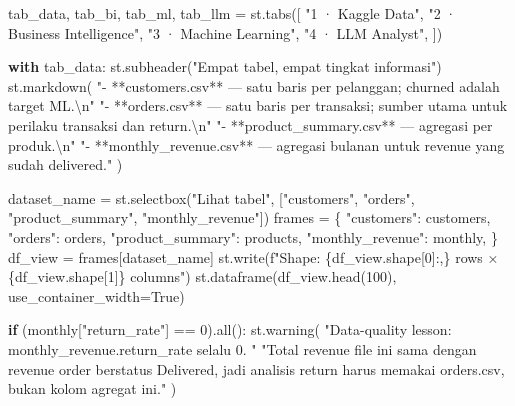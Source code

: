 \documentclass[
  indonesian,
  letterpaper,
  DIV=11,
  numbers=noendperiod]{scrreprt}
\newenvironment{Shaded}{\begin{snugshade}}{\end{snugshade}}
\newcommand{\BuiltInTok}[1]{\textcolor[rgb]{0.00,0.23,0.31}{#1}}
\newcommand{\CharTok}[1]{\textcolor[rgb]{0.13,0.47,0.30}{#1}}
\newcommand{\ControlFlowTok}[1]{\textcolor[rgb]{0.00,0.23,0.31}{\textbf{#1}}}
\newcommand{\DecValTok}[1]{\textcolor[rgb]{0.68,0.00,0.00}{#1}}
\newcommand{\NormalTok}[1]{\textcolor[rgb]{0.00,0.23,0.31}{#1}}
\newcommand{\OperatorTok}[1]{\textcolor[rgb]{0.37,0.37,0.37}{#1}}
\newcommand{\SpecialCharTok}[1]{\textcolor[rgb]{0.37,0.37,0.37}{#1}}
\newcommand{\SpecialStringTok}[1]{\textcolor[rgb]{0.13,0.47,0.30}{#1}}
\newcommand{\StringTok}[1]{\textcolor[rgb]{0.13,0.47,0.30}{#1}}
\newcommand{\VariableTok}[1]{\textcolor[rgb]{0.07,0.07,0.07}{#1}}
\begin{document}
\begin{Shaded}
\begin{Highlighting}[]
\NormalTok{tab\_data, tab\_bi, tab\_ml, tab\_llm }\OperatorTok{=}\NormalTok{ st.tabs([}
    \StringTok{"1 · Kaggle Data"}\NormalTok{,}
    \StringTok{"2 · Business Intelligence"}\NormalTok{,}
    \StringTok{"3 · Machine Learning"}\NormalTok{,}
    \StringTok{"4 · LLM Analyst"}\NormalTok{,}
\NormalTok{])}

\ControlFlowTok{with}\NormalTok{ tab\_data:}
\NormalTok{    st.subheader(}\StringTok{"Empat tabel, empat tingkat informasi"}\NormalTok{)}
\NormalTok{    st.markdown(}
        \StringTok{"{-} **customers.csv** — satu baris per pelanggan; \textasciigrave{}churned\textasciigrave{} adalah target ML.}\CharTok{\textbackslash{}n}\StringTok{"}
        \StringTok{"{-} **orders.csv** — satu baris per transaksi; sumber utama untuk perilaku transaksi dan return.}\CharTok{\textbackslash{}n}\StringTok{"}
        \StringTok{"{-} **product\_summary.csv** — agregasi per produk.}\CharTok{\textbackslash{}n}\StringTok{"}
        \StringTok{"{-} **monthly\_revenue.csv** — agregasi bulanan untuk revenue yang sudah delivered."}
\NormalTok{    )}

\NormalTok{    dataset\_name }\OperatorTok{=}\NormalTok{ st.selectbox(}\StringTok{"Lihat tabel"}\NormalTok{, [}\StringTok{"customers"}\NormalTok{, }\StringTok{"orders"}\NormalTok{, }\StringTok{"product\_summary"}\NormalTok{, }\StringTok{"monthly\_revenue"}\NormalTok{])}
\NormalTok{    frames }\OperatorTok{=}\NormalTok{ \{}
        \StringTok{"customers"}\NormalTok{: customers,}
        \StringTok{"orders"}\NormalTok{: orders,}
        \StringTok{"product\_summary"}\NormalTok{: products,}
        \StringTok{"monthly\_revenue"}\NormalTok{: monthly,}
\NormalTok{    \}}
\NormalTok{    df\_view }\OperatorTok{=}\NormalTok{ frames[dataset\_name]}
\NormalTok{    st.write(}\SpecialStringTok{f"Shape: }\SpecialCharTok{\{}\NormalTok{df\_view}\SpecialCharTok{.}\NormalTok{shape[}\DecValTok{0}\NormalTok{]}\SpecialCharTok{:,\}}\SpecialStringTok{ rows × }\SpecialCharTok{\{}\NormalTok{df\_view}\SpecialCharTok{.}\NormalTok{shape[}\DecValTok{1}\NormalTok{]}\SpecialCharTok{\}}\SpecialStringTok{ columns"}\NormalTok{)}
\NormalTok{    st.dataframe(df\_view.head(}\DecValTok{100}\NormalTok{), use\_container\_width}\OperatorTok{=}\VariableTok{True}\NormalTok{)}

    \ControlFlowTok{if}\NormalTok{ (monthly[}\StringTok{"return\_rate"}\NormalTok{] }\OperatorTok{==} \DecValTok{0}\NormalTok{).}\BuiltInTok{all}\NormalTok{():}
\NormalTok{        st.warning(}
            \StringTok{"Data{-}quality lesson: \textasciigrave{}monthly\_revenue.return\_rate\textasciigrave{} selalu 0. "}
            \StringTok{"Total revenue file ini sama dengan revenue order berstatus Delivered, jadi analisis return harus memakai \textasciigrave{}orders.csv\textasciigrave{}, bukan kolom agregat ini."}
\NormalTok{        )}


\end{Highlighting}
\end{Shaded}
\end{document}
